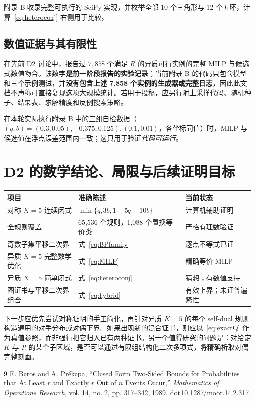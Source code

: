 \documentclass[11pt,a4paper]{ctexart}
\theoremstyle{definition}
\begin{document}
附录 B 收录完整可执行的 SciPy 实现，并枚举全部 10 个三角形与 12 个五环，计算~\eqref{eq:heteroconj} 右侧用于比较。

\subsection{数值证据与其有限性}
在先前 D2 讨论中，报告过 $7,858$ 个满足 $R$ 的异质可行实例的完整 MILP 与候选式数值吻合。该数字\textbf{是前一阶段报告的实验记录}；当前附录 B 的代码只包含模型和三个示例测试，并\textbf{没有包含上述 7,858 个实例的生成器或完整日志}，因此此文档不声称可直接复现这项大规模统计。若用于投稿，应另行附上采样代码、随机种子、结果表、求解精度和反例搜索策略。

在本轮实际执行附录 B 中的三组自检数据（$(q,b)=(0.3,0.05),(0.375,0.125),(0.1,0.01)$，各坐标同值）时，MILP 与候选值在浮点误差范围内一致；这只用于验证\emph{代码可运行}。

\section{D2 的数学结论、局限与后续证明目标}
\begin{center}
\begin{tabularx}{\textwidth}{@{}p{}X p{}@{}}
\toprule
项目 & 准确陈述 & 当前状态\\
\midrule
对称 $K=5$ 连续闭式 & $\min\{q,3b,1-5q+10b\}$ & 计算机辅助证明\\
全规则覆盖 & 65,536 个规则，1,088 个置换等价类 & 严格有理数验证\\
奇数子集平移二次界 & 式~\eqref{eq:BPfamily} & 逐点不等式已证\\
异质 $K=5$ 完整数学优化 & 式~\eqref{eq:MILP} & 精确等价 MILP\\
异质 $K=5$ 简单闭式 & 式~\eqref{eq:heteroconj} & 猜想；有数值支持\\
图证书与平移二次界组合 & 式~\eqref{eq:hybrid} & 有效上界；未证普遍紧性\\
\bottomrule
\end{tabularx}
\end{center}

下一步应优先尝试对称证明的手工简化，再针对异质 $K=5$ 的每个 self-dual 规则构造通用的对手分布或对偶下界。如果出现新的混合证书，则应以~\eqref{eq:exactQ} 作为真值参照，而非强行把它归入已有两种证书。另一个值得研究的问题是：对给定 $K$ 与 $R$ 的某个子区域，是否可以通过有限组结构化二次多项式，将精确析取对偶完整刻画。

\begin{thebibliography}{9}
E. Boros and A. Pr\'{e}kopa,
``Closed Form Two-Sided Bounds for Probabilities that At Least $r$ and Exactly $r$ Out of $n$ Events Occur,''
\emph{Mathematics of Operations Research}, vol. 14, no. 2, pp. 317--342, 1989.
\href{https://doi.org/10.1287/moor.14.2.317}{doi:10.1287/moor.14.2.317}.
\end{thebibliography}
\end{document}
